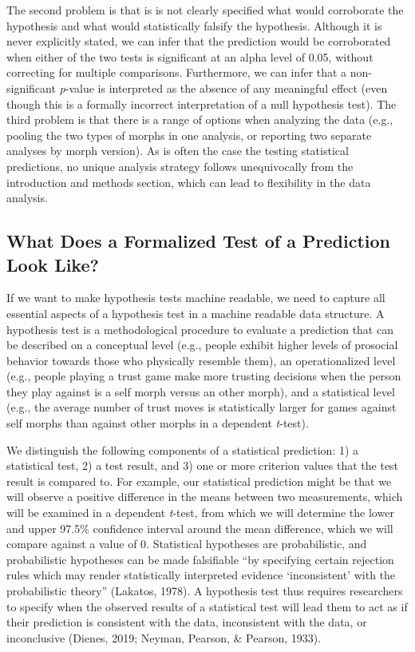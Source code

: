 \documentclass[doc,floatsintext]{apa6}
\begin{document}
The second problem is that is is not clearly specified what would corroborate the hypothesis and what would statistically falsify the hypothesis. Although it is never explicitly stated, we can infer that the prediction would be corroborated when either of the two tests is significant at an alpha level of 0.05, without correcting for multiple comparisons. Furthermore, we can infer that a non-significant \emph{p}-value is interpreted as the absence of any meaningful effect (even though this is a formally incorrect interpretation of a null hypothesis test). The third problem is that there is a range of options when analyzing the data (e.g., pooling the two types of morphs in one analysis, or reporting two separate analyses by morph version). As is often the case the testing statistical predictions, no unique analysis strategy follows unequivocally from the introduction and methods section, which can lead to flexibility in the data analysis.

\hypertarget{what-does-a-formalized-test-of-a-prediction-look-like}{%
\subsection{What Does a Formalized Test of a Prediction Look Like?}\label{what-does-a-formalized-test-of-a-prediction-look-like}}

If we want to make hypothesis tests machine readable, we need to capture all essential aspects of a hypothesis test in a machine readable data structure. A hypothesis test is a methodological procedure to evaluate a prediction that can be described on a conceptual level (e.g., people exhibit higher levels of prosocial behavior towards those who physically resemble them), an operationalized level (e.g., people playing a trust game make more trusting decisions when the person they play against is a self morph versus an other morph), and a statistical level (e.g., the average number of trust moves is statistically larger for games against self morphs than against other morphs in a dependent \emph{t}-test).

We distinguish the following components of a statistical prediction: 1) a statistical test, 2) a test result, and 3) one or more criterion values that the test result is compared to. For example, our statistical prediction might be that we will observe a positive difference in the means between two measurements, which will be examined in a dependent \emph{t}-test, from which we will determine the lower and upper 97.5\% confidence interval around the mean difference, which we will compare against a value of 0. Statistical hypotheses are probabilistic, and probabilistic hypotheses can be made falsifiable \enquote{by specifying certain rejection rules which may render statistically interpreted evidence \enquote{inconsistent} with the probabilistic theory} (Lakatos, 1978). A hypothesis test thus requires researchers to specify when the observed results of a statistical test will lead them to act as if their prediction is consistent with the data, inconsistent with the data, or inconclusive (Dienes, 2019; Neyman, Pearson, \& Pearson, 1933).
\end{document}
